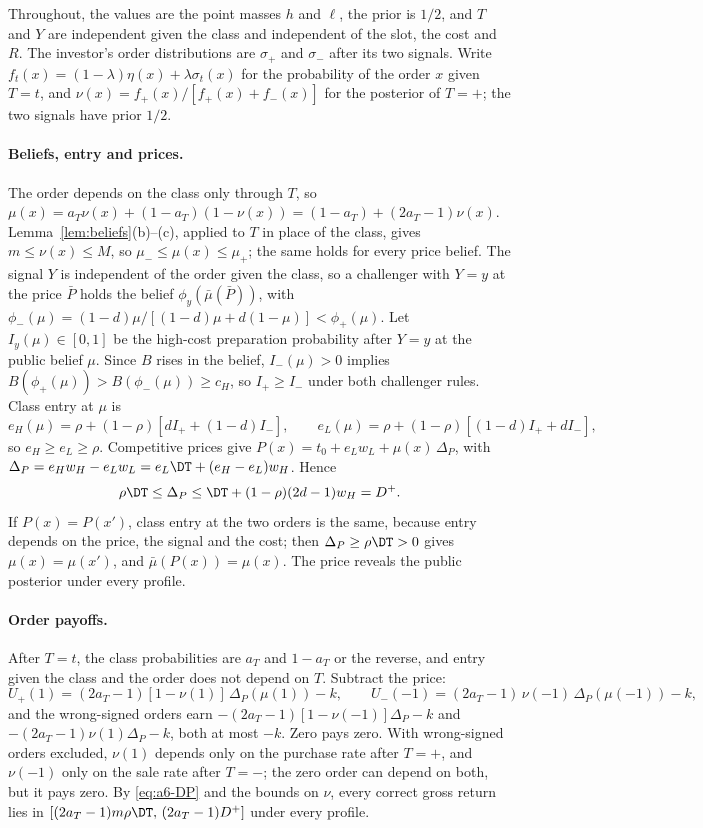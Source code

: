 Throughout, the values are the point masses \(h\) and \(\ell\), the prior is \(1/2\), and \(T\) and \(Y\) are
independent given the class and independent of the slot, the cost and \(R\). The investor's order distributions are
\(\sigma_+\) and \(\sigma_-\) after its two signals. Write \(f_t(x)=(1-\lambda)\eta(x)+\lambda\sigma_t(x)\) for the
probability of the order \(x\) given \(T=t\), and \(\nu(x)=f_+(x)/[f_+(x)+f_-(x)]\) for the posterior of \(T=+\); the
two signals have prior \(1/2\).

\paragraph{Beliefs, entry and prices.}
The order depends on the class only through \(T\), so \(\mu(x)=a_T\nu(x)+(1-a_T)(1-\nu(x))=(1-a_T)+(2a_T-1)\nu(x)\).
Lemma~\ref{lem:beliefs}(b)--(c), applied to \(T\) in place of the class, gives \(m\le\nu(x)\le M\), so
\(\mu_-\le\mu(x)\le\mu_+\); the same holds for every price belief. The signal \(Y\) is independent of the order given
the class, so a challenger with \(Y=y\) at the price \(\bar P\) holds the belief \(\phi_y(\bar\mu(\bar P))\), with
\(\phi_-(\mu)=(1-d)\mu/[(1-d)\mu+d(1-\mu)]<\phi_+(\mu)\). Let \(I_y(\mu)\in[0,1]\) be the high-cost preparation
probability after \(Y=y\) at the public belief \(\mu\). Since \(B\) rises in the belief, \(I_-(\mu)>0\) implies
\(B(\phi_+(\mu))>B(\phi_-(\mu))\ge c_H\), so \(I_+\ge I_-\) under both challenger rules. Class entry at \(\mu\) is
\[
e_H(\mu)=\rho+(1-\rho)[dI_++(1-d)I_-],\qquad e_L(\mu)=\rho+(1-\rho)[(1-d)I_++dI_-],
\]
so \(e_H\ge e_L\ge\rho\). Competitive prices give \(P(x)=t_0+e_L w_L+\mu(x)\,\Delta_P\), with
\(\Delta_P=e_Hw_H-e_Lw_L=e_L\DT+(e_H-e_L)w_H\). Hence
\begin{equation}\label{eq:a6-DP}
\rho\DT\le\Delta_P\le\DT+(1-\rho)(2d-1)w_H=D^+ .
\end{equation}
If \(P(x)=P(x')\), class entry at the two orders is the same, because entry depends on the price, the signal and the
cost; then \(\Delta_P\ge\rho\DT>0\) gives \(\mu(x)=\mu(x')\), and \(\bar\mu(P(x))=\mu(x)\). The price reveals the public
posterior under every profile.

\paragraph{Order payoffs.}
After \(T=t\), the class probabilities are \(a_T\) and \(1-a_T\) or the reverse, and entry given the class and the
order does not depend on \(T\). Subtract the price:
\[
U_+(1)=(2a_T-1)[1-\nu(1)]\,\Delta_P(\mu(1))-k,\qquad U_-(-1)=(2a_T-1)\,\nu(-1)\,\Delta_P(\mu(-1))-k,
\]
and the wrong-signed orders earn \(-(2a_T-1)[1-\nu(-1)]\Delta_P-k\) and \(-(2a_T-1)\nu(1)\Delta_P-k\), both at most \(-k\).
Zero pays zero. With wrong-signed orders excluded, \(\nu(1)\) depends only on the purchase rate after \(T=+\), and
\(\nu(-1)\) only on the sale rate after \(T=-\); the zero order can depend on both, but it pays zero. By
\eqref{eq:a6-DP} and the bounds on \(\nu\), every correct gross return lies in \([(2a_T-1)m\rho\DT,\,(2a_T-1)D^+]\)
under every profile.

